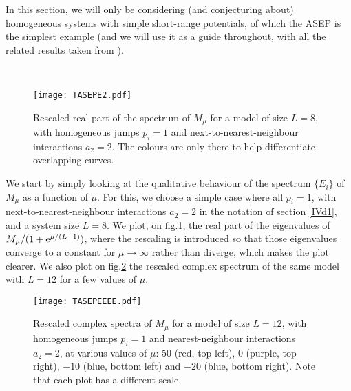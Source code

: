 \documentclass[aps,pre,onecolumn,showpacs,showkeys,a4paper]{revtex4-1}
\begin{document}
In this section, we will only be considering (and conjecturing about) homogeneous systems with simple short-range potentials, of which the ASEP is the simplest example (and we will use it as a guide throughout, with all the related results taken from \cite{Lazarescu2015}).

~

 \begin{figure}[ht]
\begin{center}
 \texttt{[image: TASEPE2.pdf]}
  \caption{Rescaled real part of the spectrum of $M_{\mu}$ for a model of size $L=8$, with homogeneous jumps $p_i=1$ and next-to-nearest-neighbour interactions $a_2=2$. The colours are only there to help differentiate overlapping curves.}
\label{fig-E3}
 \end{center}
 \end{figure}
We start by simply looking at the qualitative behaviour of the spectrum $\{E_i\}$ of $M_\mu$ as a function of $\mu$. For this, we choose a simple case where all $p_i=1$, with next-to-nearest-neighbour interactions $a_2=2$ in the notation of section \ref{IVd1}, and a system size $L=8$. We plot, on fig.\ref{fig-E3}, the real part of the eigenvalues of $M_\mu/(1+{\rm e}^{\mu/(L+1)})$, where the rescaling is introduced so that those eigenvalues converge to a constant for $\mu\rightarrow\infty$ rather than diverge, which makes the plot clearer. We also plot on fig.\ref{fig-EEEE} the rescaled complex spectrum of the same model with $L=12$ for a few values of $\mu$.
 \begin{figure}[ht]
\begin{center}
 \texttt{[image: TASEPEEEE.pdf]}
  \caption{Rescaled complex spectra of $M_{\mu}$ for a model of size $L=12$, with homogeneous jumps $p_i=1$ and nearest-neighbour interactions $a_2=2$, at various values of $\mu$: $50$ (red, top left), $0$ (purple, top right), $-10$ (blue, bottom left) and $-20$ (blue, bottom right). Note that each plot has a different scale.}
\label{fig-EEEE}
 \end{center}
 \end{figure}
 
\end{document}
